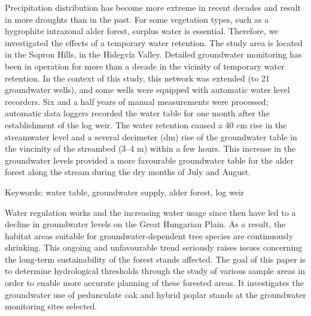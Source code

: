 Precipitation distribution has become more extreme in recent decades and result in more droughts than in the past. For some vegetation types, such as a hygrophite intrazonal alder forest, surplus water is essential. Therefore, we investigated the effects of a temporary water retention. The study area is located in the Sopron Hills, in the Hidegvíz Valley. Detailed groundwater monitoring has been in operation for more than a decade in the vicinity of temporary water retention. In the context of this study, this network was extended (to 21 groundwater wells), and some wells were equipped with automatic water level recorders. Six and a half years of manual measurements were processed; automatic data loggers recorded the water table for one month after the establishment of the log weir. The water retention caused a 40 cm rise in the streamwater level and a several decimeter (dm) rise of the groundwater table in the vincinity of the streambed (3–4 m) within a few hours. This increase in the groundwater levels provided a more favourable groundwater table for the alder forest along the stream during the dry months of July and August. 

Keywords: water table, groundwater supply, alder forest, log weir
\newpage{}
{}
\begin{flushleft}





\end{flushleft}

\noindent

Water regulation works and the increasing water usage since then have led to a decline in groundwater levels on the Great Hungarian Plain. As a result, the habitat areas suitable for groundwater-dependent tree species are continuously shrinking. This ongoing and unfavourable trend seriously raises issues concerning the long-term sustainability of the forest stands affected. The goal of this paper is to determine hydrological thresholds through the study of various sample areas in order to enable more accurate planning of these forested areas. It investigates the groundwater use of pedunculate oak and hybrid poplar stands at the groundwater monitoring sites selected.

